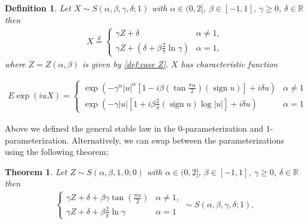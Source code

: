 \documentclass{article}
\newtheorem{theorem}{Theorem}
\newtheorem{definition}{Definition}
\begin{document}
		\begin{definition} Let $X \sim S(\alpha, \beta , \gamma, \delta; 1)$ with $\alpha \in (0,2]$, $\beta \in [-1,1]$, $\gamma \ge 0$, $\delta\in\mathbb{R}$ then  
			\begin{gather*}
				X \stackrel{d}{=} 
				\begin{cases}
					\gamma Z + \delta & \alpha \ne 1,\\
					\gamma Z + (\delta + \beta\frac{2}{\pi}\ln\gamma)& \alpha = 1,
				\end{cases}
			\end{gather*}
			where $Z = Z(\alpha,\beta)$ is given by \ref{def:case Z}. $X$ has characteristic function
			
			\begin{gather*}
				E \exp (i u X)= 
				\begin{cases}
					\exp \left(-\gamma^\alpha|u|^\alpha\left[1-i \beta\left(\tan \frac{\pi \alpha}{2}\right)(\operatorname{sign} u)\right]+i \delta u\right) & \alpha \neq 1 \\ \exp \left(-\gamma|u|\left[1+i \beta \frac{2}{\pi}(\operatorname{sign} u) \log |u|\right]+i \delta u\right) & \alpha=1
				\end{cases}
			\end{gather*}
		\end{definition}

		Above we defined the general stable law in the 0-parameterization and 1-parameterization.
		Alternatively, we can swap between the parameterizations using the following theorem;
		\begin{theorem}Let $Z\sim S(\alpha,\beta,1,0;0)$  with $\alpha \in (0,2]$, $\beta \in [-1,1]$, $\gamma \ge 0$, $\delta\in\mathbb{R}$ then  
			\begin{gather*}
				\begin{cases}
					\gamma Z + \delta + \beta \gamma \tan\left(\frac{\pi\alpha}{2}\right) &\alpha\ne1,\\
					\gamma Z + \delta + \beta \frac{2}{\pi}\ln\gamma  &\alpha=1
				\end{cases}\sim S(\alpha,\beta,\gamma,\delta; 1),
			\end{gather*}
		\end{theorem}
\end{document}
